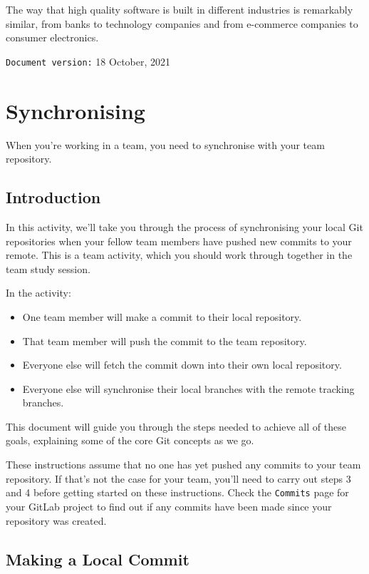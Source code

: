 \documentclass[
]{book}
\providecommand{\tightlist}{%
  \setlength{\itemsep}{0pt}\setlength{\parskip}{0pt}}
\begin{document}
The way that high quality software is built in different industries is remarkably similar, from banks to technology companies and from e-commerce companies to consumer electronics.

\texttt{Document\ version:} 18 October, 2021

\hypertarget{syncing}{%
\chapter{Synchronising}\label{syncing}}

When you're working in a team, you need to synchronise with your team repository.

\hypertarget{syncintro}{%
\section{Introduction}\label{syncintro}}

In this activity, we'll take you through the process of synchronising your local Git repositories when your fellow team members have pushed new commits to your remote. This is a team activity, which you should work through together in the team study session.

In the activity:

\begin{itemize}
\tightlist
\item
  One team member will make a commit to their local repository.
\item
  That team member will push the commit to the team repository.
\item
  Everyone else will fetch the commit down into their own local repository.
\item
  Everyone else will synchronise their local branches with the remote tracking branches.
\end{itemize}

This document will guide you through the steps needed to achieve all of these goals, explaining some of the core Git concepts as we go.

These instructions assume that no one has yet pushed any commits to your team repository. If that's not the case for your team, you'll need to carry out steps 3 and 4 before getting started on these instructions. Check the \texttt{Commits} page for your GitLab project to find out if any commits have been made since your repository was created.

\hypertarget{locommit}{%
\section{Making a Local Commit}\label{locommit}}
\end{document}
